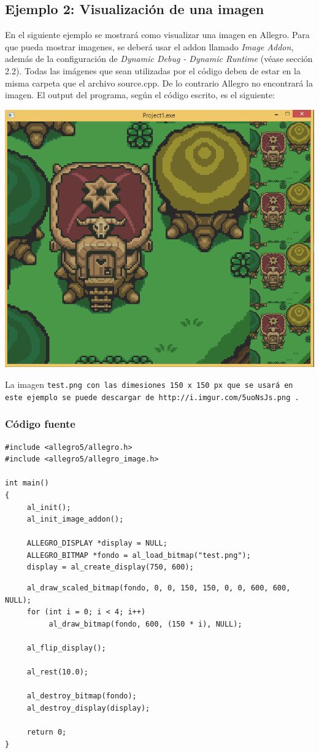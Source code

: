 \documentclass[11pt]{article}
\begin{document}
\subsection{Ejemplo 2:  Visualización de una imagen}
En el siguiente ejemplo se mostrará como visualizar una imagen en Allegro. Para que pueda mostrar imagenes, se deberá usar el addon llamado \emph{Image Addon}, además de la configuración de \emph{Dynamic Debug - Dynamic Runtime} (véase sección 2.2). Todas las imágenes que sean utilizadas por el código deben de estar en la misma carpeta que el archivo source.cpp. De lo contrario Allegro no encontrará la imagen. El output del programa, según el código escrito, es el siguiente:
\begin{center}
\includegraphics[scale=0.3]{SC12.png}
\end{center}
La imagen \tt test.png \rm con las dimesiones 150 x 150 px que se usará en este ejemplo se puede descargar de \tt http://i.imgur.com/5uoNsJs.png \rm .
\subsubsection{Código fuente}
\begin{verbatim}
#include <allegro5/allegro.h>
#include <allegro5/allegro_image.h>

int main() 
{
     al_init();
     al_init_image_addon();
     
     ALLEGRO_DISPLAY *display = NULL;
     ALLEGRO_BITMAP *fondo = al_load_bitmap("test.png");
     display = al_create_display(750, 600);
\end{verbatim}
\pagebreak
\begin{verbatim}
     al_draw_scaled_bitmap(fondo, 0, 0, 150, 150, 0, 0, 600, 600, NULL);
     for (int i = 0; i < 4; i++)
          al_draw_bitmap(fondo, 600, (150 * i), NULL);
      
     al_flip_display();
     
     al_rest(10.0);
     
     al_destroy_bitmap(fondo);
     al_destroy_display(display);
     
     return 0;
}
\end{verbatim}
\end{document}
